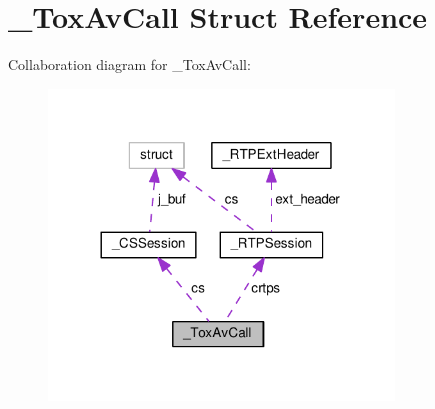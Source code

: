 \hypertarget{struct___tox_av_call}{\section{\+\_\+\+Tox\+Av\+Call Struct Reference}
\label{struct___tox_av_call}
}


Collaboration diagram for \+\_\+\+Tox\+Av\+Call\+:
\nopagebreak
\begin{figure}[H]
\begin{center}
\leavevmode
\includegraphics[width=260pt]{struct___tox_av_call__coll__graph}
\end{center}
\end{figure}
